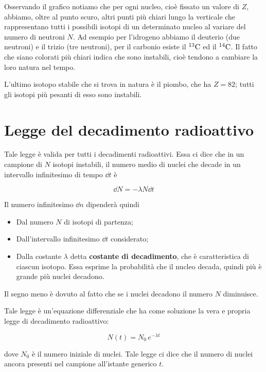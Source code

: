 Osservando il grafico notiamo che per ogni nucleo, cioè fissato un valore di $Z$, abbiamo, oltre al punto scuro, altri punti più chiari lungo la verticale che rappresentano tutti i possibili isotopi di un determinato nucleo al variare del numero di neutroni $N$. Ad esempio per l'idrogeno abbiamo il deuterio (due neutroni) e il trizio (tre neutroni), per il carbonio esiste il $\rm ^{13}C$ ed il $\rm ^{14}C$. Il fatto che siano colorati più chiari indica che sono instabili, cioè tendono a cambiare la loro natura nel tempo.

L'ultimo isotopo stabile che si trova in natura è il piombo, che ha $Z=82$; tutti gli isotopi più pesanti di esso sono instabili.

\section{Legge del decadimento radioattivo}

Tale legge è valida per tutti i decadimenti radioattivi. Essa ci dice che in un campione di $N$ isotopi instabili, il numero medio di nuclei che decade in un intervallo infinitesimo di tempo $\dd{t}$ è

\begin{equation*}
    \dd{N}=-\lambda N\dd{t}
\end{equation*}

Il numero infinitesimo $\dd{n}$ dipenderà quindi

\begin{itemize}
    \item Dal numero $N$ di isotopi di partenza;
    \item Dall'intervallo infinitesimo $\dd{t}$ considerato;
    \item Dalla costante $\lambda$ detta \textbf{costante di decadimento}, che è caratteristica di ciascun isotopo. Essa esprime la probabilità che il nucleo decada, quindi più è grande più nuclei decadono.
\end{itemize}

Il segno meno è dovuto al fatto che se i nuclei decadono il numero $N$ diminuisce.

Tale legge è un'equazione differenziale che ha come soluzione la vera e propria legge di decadimento radioattivo:

\begin{equation*}
    N(t)=N_0\,e^{-\lambda t}
\end{equation*}

dove $N_0$ è il numero iniziale di nuclei. Tale legge ci dice che il numero di nuclei ancora presenti nel campione all'istante generico $t$.

